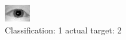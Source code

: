 \begin{figure}[h!]
\begin{center}
\includegraphics[width=0.60\columnwidth]{figures/ID964_class_1_target_2.png}
\end{center}
\caption{ Classification: 1 actual target: 2}
\label{fig:ID964_class_1_target_2}
\end{figure}
